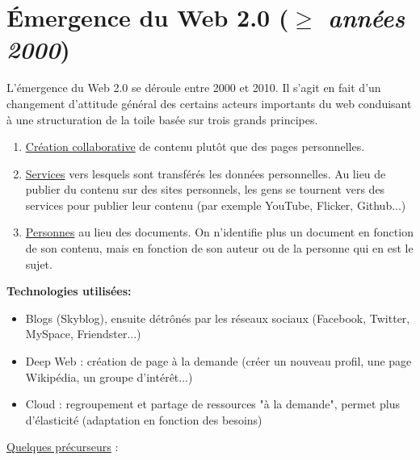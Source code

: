 \section{Émergence du Web 2.0 (\textit{$\ge$ années 2000})}
L'émergence du Web 2.0 se déroule entre 2000 et 2010. Il s'agit en fait d'un changement d'attitude général des certains acteurs importants du web conduisant à une structuration de la toile basée sur trois grands principes. 
\begin{enumerate}
    \item \underline{Création collaborative} de contenu plutôt que des pages personnelles.
    \item \underline{Services} vers lesquels sont transférés les données personnelles. Au lieu de publier du contenu  sur des sites personnels, les gens se tournent vers des services pour publier leur contenu (par exemple YouTube, Flicker, Github...)
    \item \underline{Personnes} au lieu des documents. On n'identifie plus un document en fonction de son contenu, mais en fonction de son auteur ou de la personne qui en est le sujet.
\end{enumerate} 

\vspace{0.3cm}
\textbf{Technologies utilisées:}
    \begin{itemize}
        \item Blogs (Skyblog), ensuite détrônés par les réseaux sociaux (Facebook, Twitter, MySpace, Friendster...)
        \item Deep Web : création de page à la demande (créer un nouveau profil, une page Wikipédia, un groupe d'intérêt...)
        \item Cloud : regroupement et partage de ressources "à la demande", permet plus d'élasticité (adaptation en fonction des besoins)
    \end{itemize}

\vspace{0.5cm}       

\newpage

\vspace * {0.5cm}
    
    \vspace{0.3cm}
    
    \underline{Quelques précurseurs} :
    
